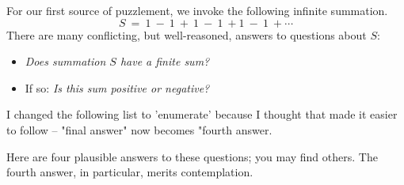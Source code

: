 \medskip

For our first source of puzzlement, we invoke the following infinite summation.
\[ S \ = \ 1 \ - \ 1 \ + \ 1 \ - \ 1 \ + 1 \ - \ 1 \ + \cdots \]
There are many conflicting, but well-reasoned, answers to questions about $S$:
\begin{itemize}
\item
{\it Does summation $S$ have a finite sum?} 
\medskip\item
If so: {\it Is this sum positive or negative?}
\end{itemize}

\smallskip

{\Arny I changed the following list to 'enumerate' because I thought that made it easier to follow -- "final answer" now becomes "fourth answer.}

\noindent
Here are four plausible answers to these questions; you may find others.  The fourth answer, in particular, merits contemplation.

